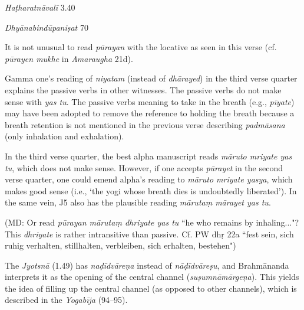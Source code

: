 \begin{ekdosis}
\begin{testimonia}[hp01_049]
\emph{Haṭharatnāvalī} 3.40

\begin{versinnote}
\end{versinnote}

\emph{Dhyānabindūpaniṣat} 70

\begin{versinnote}
\end{versinnote}

\end{testimonia}

\begin{philcomm}[hp01_049]
It is not unusual to read \emph{pūrayan} with the locative as seen in this verse (cf. \emph{pūrayen mukhe} in \emph{Amaraugha} 21d). 

Gamma one's reading of \emph{niyatam} (instead of \emph{dhārayed}) in the third verse quarter explains the passive verbs in other witnesses. The passive verbs do not make sense with \emph{yas tu}. The passive verbs meaning to take in the breath (e.g., \emph{pīyate}) may have been adopted to remove the reference to holding the breath because a breath retention is not mentioned in the previous verse describing \emph{padmāsana} (only inhalation and exhalation). 

In the third verse quarter, the best alpha manuscript reads \emph{māruto mriyate yas tu}, which does not make sense. However, if one accepts \emph{pūrayet} in the second verse quarter, one could emend alpha's reading to \emph{māruto mriyate yasya}, which makes good sense (i.e., `the yogi whose breath dies is undoubtedly liberated'). In the same vein, J5 also has the plausible reading \emph{mārutaṃ mārayet yas tu}. 

(MD: Or read \emph{pūrayan mārutaṃ dhriyate yas tu} ``he who remains by inhaling..."?
This \emph{dhriyate} is rather intransitive than passive. 
Cf. PW dhṛ 22a ``fest sein, sich ruhig verhalten, stillhalten, verbleiben, sich erhalten, bestehen")

The \emph{Jyotsnā} (1.49) has \emph{naḍīdvāreṇa} instead of \emph{nāḍīdvāreṣu}, and Brahmānanda interprets it as the opening of the central channel (\emph{suṣumnāmārgeṇa}). This yields the idea of filling up the central channel (as opposed to other channels), which is described in the \emph{Yogabīja} (94–95). 
\end{philcomm}


\end{ekdosis}
